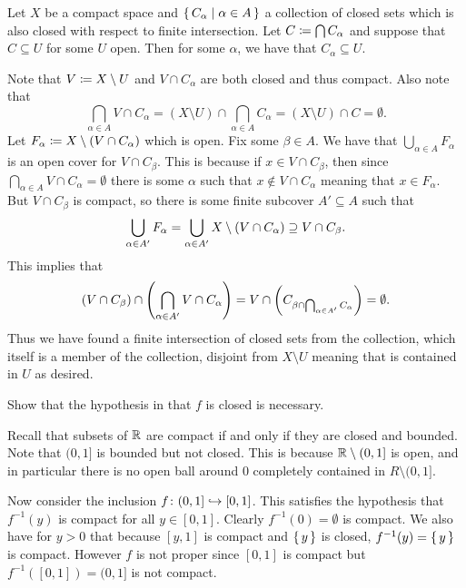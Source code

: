 \documentclass[letterpaper, 11pt]{article}
\begin{document}
\begin{exercise}
  Let $X$ be a compact space and $\set{C_{\alpha} | \alpha \in A}$ a collection of closed sets which is also closed with respect to finite intersection.
  Let $C \coloneqq \bigcap C_{\alpha}$ and suppose that $C \subseteq U$ for some $U$ open.
  Then for some $\alpha$, we have that $C_{\alpha} \subseteq U$.
\end{exercise}
\begin{pf}
  Note that $V \coloneqq X \setminus U$ and $V \cap C_{\alpha}$ are both closed and thus compact.
  Also note that
  \[
    \bigcap_{\alpha \in A} V \cap C_{\alpha} = (X \setminus U) \cap \bigcap_{\alpha \in A} C_{\alpha} = (X \setminus U) \cap C = \emptyset.
  \]
  Let $F_{\alpha} \coloneqq X \setminus (V \cap C_{\alpha})$ which is open.
  Fix some $\beta \in A$.
  We have that $\bigcup_{\alpha \in A} F_{\alpha}$ is an open cover for $V \cap C_{\beta}$.
  This is because if $x \in V \cap C_{\beta}$, then since $\bigcap_{\alpha \in A} V \cap C_{\alpha} = \emptyset$ there is some $\alpha$ such that $x \notin V \cap C_{\alpha}$ meaning that $x \in F_{\alpha}$.
  But $V \cap C_{\beta}$ is compact, so there is some finite subcover $A' \subseteq A$ such that
  \[
    \bigcup_{\alpha \in A'} F_{\alpha} = \bigcup_{\alpha \in A'} X \setminus (V \cap C_{\alpha}) \supseteq V \cap C_{\beta}.
  \]
  This implies that
  \[
    (V \cap C_{\beta}) \cap \pqty{\bigcap_{\alpha \in A'} V \cap C_{\alpha}} = V \cap \pqty{C_{\beta \cap \bigcap_{\alpha \in A'} C_{\alpha}}} = \emptyset.
  \]
  Thus we have found a finite intersection of closed sets from the collection, which itself is a member of the collection, disjoint from $X \setminus U$ meaning that is contained in $U$ as desired.
\end{pf}

\begin{exercise}
  Show that the hypothesis in  that $f$ is closed is necessary.
\end{exercise}
\begin{pf}
  Recall that subsets of $\mathbb{R}$ are compact if and only if they are closed and bounded.
  Note that $(0, 1]$ is bounded but not closed.
  This is because $\mathbb{R} \setminus (0, 1]$ is open, and in particular there is no open ball around $0$ completely contained in $R \setminus (0, 1]$.

  Now consider the inclusion $f\colon (0, 1] \into [0, 1]$.
  This satisfies the hypothesis that $f^{-1}(y)$ is compact for all $y \in [0, 1]$.
  Clearly $f^{-1}(0) = \emptyset$ is compact.
  We also have for $y > 0$ that because $[y, 1]$ is compact and $\set{y}$ is closed, $f^{-1}(y) = \set{y}$ is compact.
  However $f$ is not proper since $[0, 1]$ is compact but $f^{-1}([0, 1]) = (0, 1]$ is not compact.
\end{pf}
\end{document}
